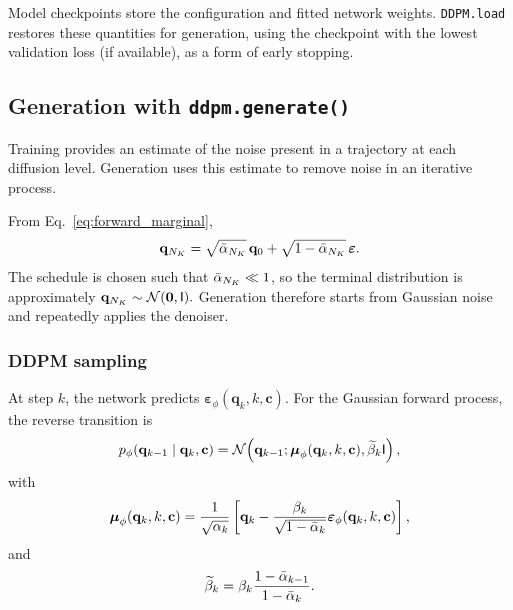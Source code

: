 Model checkpoints store the configuration and fitted network weights. \texttt{DDPM.load} restores these quantities for generation, using the checkpoint with the lowest validation loss (if available), as a form of early stopping.

\subsection{Generation with \texttt{ddpm.generate()}}
\label{ssec:generate}

Training provides an estimate of the noise present in a trajectory at each diffusion level. Generation uses this estimate to remove noise in an iterative process.

From Eq.~\eqref{eq:forward_marginal},
\begin{equation}
    \mathbf{q}_{N_K}
    =
    \sqrt{\bar{\alpha}_{N_K}}\,
    \mathbf{q}_0
    +
    \sqrt{1-\bar{\alpha}_{N_K}}\,
    \boldsymbol{\varepsilon}.
\end{equation}
The schedule is chosen such that $\bar{\alpha}_{N_K}\ll1$, so the terminal distribution is approximately $\mathbf{q}_{N_K}\sim\mathcal{N}(\mathbf{0},\mathsf{I}).$ Generation therefore starts from Gaussian noise and repeatedly applies the denoiser.

\subsubsection{DDPM sampling}
At step $k$, the network predicts $\boldsymbol{\varepsilon}_\phi(\mathbf{q}_k,k,\mathbf{c}). $ For the Gaussian forward process, the reverse transition is
\begin{equation}
    p_\phi(
        \mathbf{q}_{k-1}
        \mid
        \mathbf{q}_k,\mathbf{c}
    )
    =
    \mathcal{N}\!\left(
        \mathbf{q}_{k-1};
        \boldsymbol{\mu}_\phi
        (\mathbf{q}_k,k,\mathbf{c}),
        \widetilde{\beta}_k\mathsf{I}
    \right),
    \label{eq:ddpm_reverse_density}
\end{equation}
with
\begin{equation}
    \boldsymbol{\mu}_\phi
    (\mathbf{q}_k,k,\mathbf{c})
    =
    \frac{1}{\sqrt{\alpha_k}}
    \left[
        \mathbf{q}_k
        -
        \frac{
            \beta_k
        }{
            \sqrt{1-\bar{\alpha}_k}
        }
        \boldsymbol{\varepsilon}_\phi
        (\mathbf{q}_k,k,\mathbf{c})
    \right],
    \label{eq:ddpm_reverse_mean}
\end{equation}
and
\begin{equation}
    \widetilde{\beta}_k
    =
    \beta_k
    \frac{
        1-\bar{\alpha}_{k-1}
    }{
        1-\bar{\alpha}_k
    }.
    \label{eq:ddpm_reverse_variance}
\end{equation}

